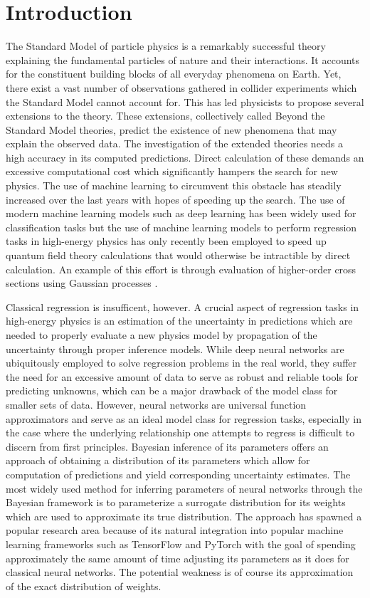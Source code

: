 \chapter*{Introduction}


The Standard Model of particle physics is a remarkably successful theory explaining the fundamental particles of nature and their interactions. It accounts for the constituent building blocks of all everyday phenomena on Earth. Yet, there exist a vast number of observations gathered in collider experiments which the Standard Model cannot account for. 
This has led physicists to propose several extensions to the theory.
These extensions, collectively called Beyond the Standard Model theories, predict the existence of new phenomena that may explain the observed data. The investigation of the extended theories needs a high accuracy in its computed predictions. Direct calculation of these demands an excessive computational cost which significantly hampers the search for new physics. The use of machine learning to 
circumvent this obstacle has steadily increased over the last years with hopes of speeding up the search. The use of modern machine learning models such as deep learning has been widely used for classification tasks but the use of machine learning models to perform regression tasks in high-energy physics has only recently been employed to speed up quantum field theory calculations that would otherwise be intractible by direct calculation. An example of this effort is through evaluation of higher-order cross sections using Gaussian processes \cite{xsec}. 

Classical regression is insufficent, however. A crucial aspect of regression tasks in high-energy physics is an estimation of the uncertainty in predictions which are needed to properly evaluate a new physics model by propagation of the uncertainty through proper inference models. While deep neural networks are ubiquitously employed to solve regression problems in the real world, they suffer the need for an excessive amount of data to serve as robust and reliable tools for predicting unknowns, which can be a major drawback of the model class for smaller sets of data. However, neural networks are universal function approximators and serve as an ideal model class for regression tasks, especially in the case where the underlying relationship one attempts to regress is difficult to discern from first principles. Bayesian inference of its parameters offers an approach of obtaining a distribution of its parameters which allow for computation of predictions and yield corresponding uncertainty estimates. The most widely used method for inferring parameters of neural networks through the Bayesian framework is to parameterize a surrogate distribution for its weights which are used to approximate its true distribution. The approach has spawned a popular research area because of its natural integration into popular machine learning frameworks such as TensorFlow and PyTorch with the goal of spending approximately the same amount of time adjusting its parameters as it does for classical neural networks. The potential weakness is of course its approximation of the exact distribution of weights. 

